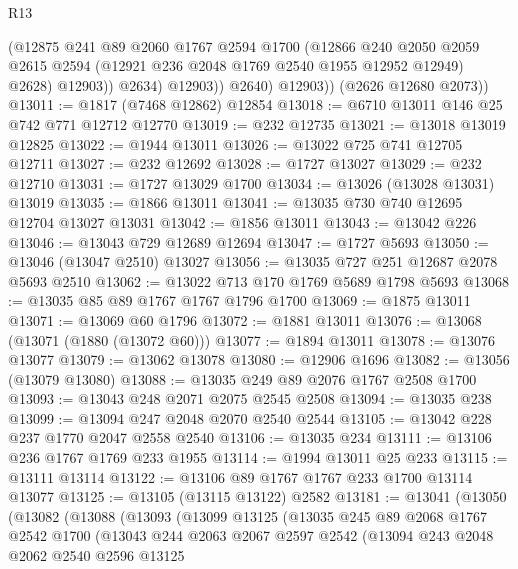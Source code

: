 \begin{lexlean}{R13}
\begin{coremodule}
                    (@12875
                      @241
                      @89
                      @2060
                      @1767
                      @2594
                      @1700
                      (@12866
                        @240
                        @2050
                        @2059
                        @2615
                        @2594
                        (@12921 @236 @2048 @1769 @2540 @1955 @12952 @12949)
                        @2628)
                      @12903))
                  @2634)
                @12903))
            @2640)
          @12903))
      (@2626 @12680 @2073))
@13011 := @1817 (@7468 @12862) @12854
@13018 := @6710 @13011 @146 @25 @742 @771 @12712 @12770
@13019 := @232 @12735
@13021 := @13018 @13019 @12825
@13022 := @1944 @13011
@13026 := @13022 @725 @741 @12705 @12711
@13027 := @232 @12692
@13028 := @1727 @13027
@13029 := @232 @12710
@13031 := @1727 @13029 @1700
@13034 := @13026 (@13028 @13031) @13019
@13035 := @1866 @13011
@13041 := @13035 @730 @740 @12695 @12704 @13027 @13031
@13042 := @1856 @13011
@13043 := @13042 @226
@13046 := @13043 @729 @12689 @12694
@13047 := @1727 @5693
@13050 := @13046 (@13047 @2510) @13027
@13056 := @13035 @727 @251 @12687 @2078 @5693 @2510
@13062 := @13022 @713 @170 @1769 @5689 @1798 @5693
@13068 := @13035 @85 @89 @1767 @1767 @1796 @1700
@13069 := @1875 @13011
@13071 := @13069 @60 @1796
@13072 := @1881 @13011
@13076 := @13068 (@13071 (@1880 (@13072 @60)))
@13077 := @1894 @13011
@13078 := @13076 @13077
@13079 := @13062 @13078
@13080 := @12906 @1696
@13082 := @13056 (@13079 @13080)
@13088 := @13035 @249 @89 @2076 @1767 @2508 @1700
@13093 := @13043 @248 @2071 @2075 @2545 @2508
@13094 := @13035 @238
@13099 := @13094 @247 @2048 @2070 @2540 @2544
@13105 := @13042 @228 @237 @1770 @2047 @2558 @2540
@13106 := @13035 @234
@13111 := @13106 @236 @1767 @1769 @233 @1955
@13114 := @1994 @13011 @25 @233
@13115 := @13111 @13114
@13122 := @13106 @89 @1767 @1767 @233 @1700 @13114 @13077
@13125 := @13105 (@13115 @13122) @2582
@13181 := @13041
    (@13050
      (@13082
        (@13088
          (@13093
            (@13099
              @13125
              (@13035
                @245
                @89
                @2068
                @1767
                @2542
                @1700
                (@13043
                  @244
                  @2063
                  @2067
                  @2597
                  @2542
                  (@13094
                    @243
                    @2048
                    @2062
                    @2540
                    @2596
                    @13125

\end{coremodule}
\end{lexlean}

